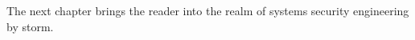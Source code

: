 \documentclass[../../main/main.tex]{subfiles}
\begin{document}
The next chapter brings the reader into the realm of systems security engineering by \gls{storm}.
%
%
%
\end{document}
